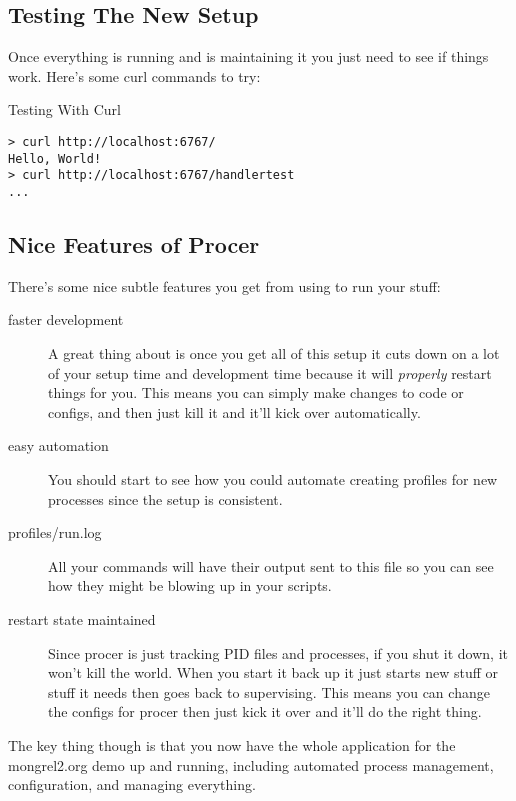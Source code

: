 \subsection{Testing The New Setup}

Once everything is running and  is maintaining it you 
just need to see if things work.  Here's some curl commands to try:

\begin{code}{Testing With Curl}
\begin{Verbatim}
> curl http://localhost:6767/
Hello, World!
> curl http://localhost:6767/handlertest
...
\end{Verbatim}
\end{code}


\subsection{Nice Features of Procer}

There's some nice subtle features you get from using 
to run your stuff:

\begin{description}
\item [faster development]  A great thing about  is once you get all of this setup
    it cuts down on a lot of your setup time and development time because
    it will \emph{properly} restart things for you.  This means you can
    simply make changes to code or configs, and then just kill it and
    it'll kick over automatically.
\item [easy automation]  You should start to see how you could automate creating
    profiles for new processes since the setup is consistent.
\item [profiles/run.log]  All your commands will have their output sent to
    this file so you can see how they might be blowing up in your scripts.
\item [restart state maintained]  Since procer is just tracking PID files and 
    processes, if you shut it down, it won't kill the world.  When you start
    it back up it just starts new stuff or stuff it needs then goes back to
    supervising.  This means you can change the configs for procer then just   
    kick it over and it'll do the right thing.
\end{description}

The key thing though is that you now have the whole application for
the mongrel2.org demo up and running, including automated process management,
configuration, and managing everything.


